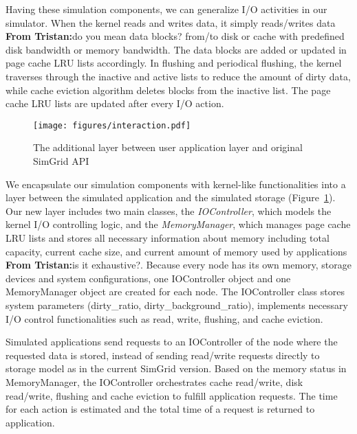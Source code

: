\documentclass[conference]{IEEEtran}
\newcommand{\tristan}[1]{\color{orange}\textbf{From Tristan:}#1\color{black}}
\begin{document}
			Having these simulation components, we can generalize I/O activities in
			our simulator. When the kernel reads and writes data, it simply 
			reads/writes data \tristan{do you mean data blocks?} from/to disk or cache with predefined disk bandwidth 
			or memory bandwidth. The data blocks are added or updated in page cache 
			LRU lists accordingly. In flushing and periodical flushing, the kernel 
			traverses through the inactive and active lists to reduce the amount of 
			dirty data, while cache eviction algorithm deletes blocks from the 
			inactive list. The page cache LRU lists are updated after every I/O action.
			
			\begin{figure}
   				\centering
   				\texttt{[image: figures/interaction.pdf]}
   				\caption{The additional layer between user application layer and 
   				original SimGrid API}\label{fig:interaction}
			\end{figure}			
			
			We encapsulate our simulation components with kernel-like functionalities 
			into a layer between the simulated application and the simulated storage (Figure~\ref{fig:interaction}). Our new layer includes two main
			classes, the \emph{IOController}, which models the kernel 
			I/O controlling logic, and the \emph{MemoryManager}, which 
			manages page cache LRU lists and stores all necessary information about 
			memory including total capacity, current cache size, and current amount of memory used 
			by applications \tristan{is it exhaustive?}. Because every node has its own memory, storage devices 
			and system configurations, one IOController object and one 
			MemoryManager object are created for each node. The IOController class 
			stores system parameters (dirty{\_}ratio, dirty{\_}background{\_}ratio), 
			implements necessary I/O control functionalities such as read, write,
			flushing, and cache eviction. 

			Simulated applications send requests to an IOController of the
			node where the requested data is stored, instead of sending
			read/write requests directly to storage model as in the current
			SimGrid version. Based on the memory status in 
			MemoryManager, the IOController orchestrates cache read/write, 
			disk read/write, flushing and cache eviction to fulfill application 
			requests. The time for each action is estimated and the total time of 
			a request is returned to application.
			
\end{document}
